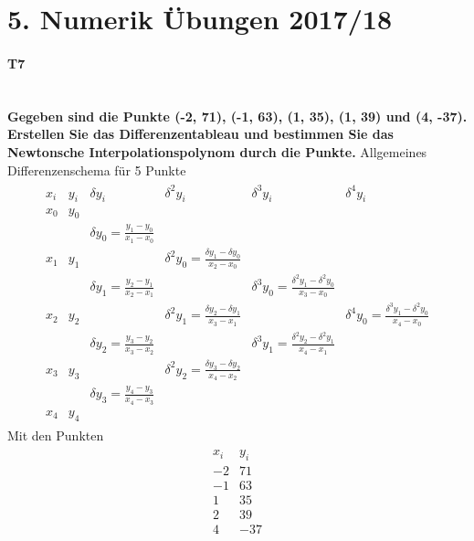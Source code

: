 \documentclass[10pt,a4paper]{article}
\begin{document}
	\section*{5. Numerik Übungen 2017/18}
	\paragraph{T7}\mbox{}\\
	\textbf{Gegeben sind die Punkte (-2, 71), (-1, 63), (1, 35), (1, 39) und (4, -37).\\
	Erstellen Sie das Differenzentableau und bestimmen Sie das Newtonsche Interpolationspolynom durch die Punkte.}
	Allgemeines Differenzenschema für 5 Punkte
   \begin{align*}
   \begin{array}{cc|cccc}
   	x_i & y_i &              \delta y_i              &                     \delta^2 y_i                     &                       \delta^3 y_i                       &                       \delta^4 y_i                       \\ \hline
   	x_0 & y_0 &  \\
   	    &     & \delta y_0 = \frac{y_1-y_0}{x_1-x_0} &  \\
   	x_1 & y_1 &                                      & \delta^2 y_0 = \frac{\delta y_1-\delta y_0}{x_2-x_0} &  \\
   	    &     & \delta y_1 = \frac{y_2-y_1}{x_2-x_1} &                                                      & \delta^3 y_0 = \frac{\delta^2 y_1-\delta^2 y_0}{x_3-x_0} &  \\
   	x_2 & y_2 &                                      & \delta^2 y_1 = \frac{\delta y_2-\delta y_1}{x_3-x_1} &                                                          & \delta^4 y_0 = \frac{\delta^3 y_1-\delta^2 y_0}{x_4-x_0} \\
   	    &     & \delta y_2 = \frac{y_3-y_2}{x_3-x_2} &                                                      & \delta^3 y_1 = \frac{\delta^2 y_2-\delta^2 y_1}{x_4-x_1} &  \\
   	x_3 & y_3 &                                      & \delta^2 y_2 = \frac{\delta y_3-\delta y_2}{x_4-x_2} &  \\
   	    &     & \delta y_3 = \frac{y_4-y_3}{x_4-x_3} &  \\
   	x_4 & y_4 &
   \end{array}
   \end{align*}
   Mit den Punkten
   \begin{align*}
   	\begin{array}{rr}
	   	x_i & y_i \\
   		-2 & 71  \\
   		-1 & 63  \\
   		1  & 35  \\
   		2  & 39  \\
   		4  & -37
   	\end{array}
   \end{align*}
\end{document}
